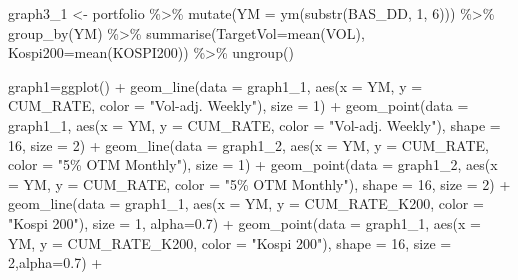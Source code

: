 \documentclass[
  a4paper,
  DIV=11,
  numbers=noendperiod]{scrreprt}
\newenvironment{Shaded}{\begin{snugshade}}{\end{snugshade}}
\newcommand{\AttributeTok}[1]{\textcolor[rgb]{0.40,0.45,0.13}{#1}}
\newcommand{\DecValTok}[1]{\textcolor[rgb]{0.68,0.00,0.00}{#1}}
\newcommand{\FloatTok}[1]{\textcolor[rgb]{0.68,0.00,0.00}{#1}}
\newcommand{\FunctionTok}[1]{\textcolor[rgb]{0.28,0.35,0.67}{#1}}
\newcommand{\NormalTok}[1]{\textcolor[rgb]{0.00,0.23,0.31}{#1}}
\newcommand{\OtherTok}[1]{\textcolor[rgb]{0.00,0.23,0.31}{#1}}
\newcommand{\SpecialCharTok}[1]{\textcolor[rgb]{0.37,0.37,0.37}{#1}}
\newcommand{\StringTok}[1]{\textcolor[rgb]{0.13,0.47,0.30}{#1}}
\begin{document}
\begin{Shaded}
\begin{Highlighting}[]
\NormalTok{graph3\_1 }\OtherTok{\textless{}{-}}\NormalTok{ portfolio }\SpecialCharTok{\%\textgreater{}\%}
  \FunctionTok{mutate}\NormalTok{(}\AttributeTok{YM =} \FunctionTok{ym}\NormalTok{(}\FunctionTok{substr}\NormalTok{(BAS\_DD, }\DecValTok{1}\NormalTok{, }\DecValTok{6}\NormalTok{))) }\SpecialCharTok{\%\textgreater{}\%}
  \FunctionTok{group\_by}\NormalTok{(YM) }\SpecialCharTok{\%\textgreater{}\%}
  \FunctionTok{summarise}\NormalTok{(}\AttributeTok{TargetVol=}\FunctionTok{mean}\NormalTok{(VOL),}
            \AttributeTok{Kospi200=}\FunctionTok{mean}\NormalTok{(KOSPI200)) }\SpecialCharTok{\%\textgreater{}\%} \FunctionTok{ungroup}\NormalTok{()}

\NormalTok{graph1}\OtherTok{=}\FunctionTok{ggplot}\NormalTok{() }\SpecialCharTok{+}
  \FunctionTok{geom\_line}\NormalTok{(}\AttributeTok{data =}\NormalTok{ graph1\_1, }\FunctionTok{aes}\NormalTok{(}\AttributeTok{x =}\NormalTok{ YM, }\AttributeTok{y =}\NormalTok{ CUM\_RATE, }\AttributeTok{color =} \StringTok{"Vol{-}adj. Weekly"}\NormalTok{), }\AttributeTok{size =} \DecValTok{1}\NormalTok{) }\SpecialCharTok{+}
  \FunctionTok{geom\_point}\NormalTok{(}\AttributeTok{data =}\NormalTok{ graph1\_1, }\FunctionTok{aes}\NormalTok{(}\AttributeTok{x =}\NormalTok{ YM, }\AttributeTok{y =}\NormalTok{ CUM\_RATE, }\AttributeTok{color =} \StringTok{"Vol{-}adj. Weekly"}\NormalTok{), }\AttributeTok{shape =} \DecValTok{16}\NormalTok{, }\AttributeTok{size =} \DecValTok{2}\NormalTok{) }\SpecialCharTok{+}
  \FunctionTok{geom\_line}\NormalTok{(}\AttributeTok{data =}\NormalTok{ graph1\_2, }\FunctionTok{aes}\NormalTok{(}\AttributeTok{x =}\NormalTok{ YM, }\AttributeTok{y =}\NormalTok{ CUM\_RATE, }\AttributeTok{color =} \StringTok{"5\% OTM Monthly"}\NormalTok{), }\AttributeTok{size =} \DecValTok{1}\NormalTok{) }\SpecialCharTok{+}
  \FunctionTok{geom\_point}\NormalTok{(}\AttributeTok{data =}\NormalTok{ graph1\_2, }\FunctionTok{aes}\NormalTok{(}\AttributeTok{x =}\NormalTok{ YM, }\AttributeTok{y =}\NormalTok{ CUM\_RATE, }\AttributeTok{color =} \StringTok{"5\% OTM Monthly"}\NormalTok{), }\AttributeTok{shape =} \DecValTok{16}\NormalTok{, }\AttributeTok{size =} \DecValTok{2}\NormalTok{) }\SpecialCharTok{+}
  \FunctionTok{geom\_line}\NormalTok{(}\AttributeTok{data =}\NormalTok{ graph1\_1, }\FunctionTok{aes}\NormalTok{(}\AttributeTok{x =}\NormalTok{ YM, }\AttributeTok{y =}\NormalTok{ CUM\_RATE\_K200, }\AttributeTok{color =} \StringTok{"Kospi 200"}\NormalTok{), }\AttributeTok{size =} \DecValTok{1}\NormalTok{, }\AttributeTok{alpha=}\FloatTok{0.7}\NormalTok{) }\SpecialCharTok{+}
  \FunctionTok{geom\_point}\NormalTok{(}\AttributeTok{data =}\NormalTok{ graph1\_1, }\FunctionTok{aes}\NormalTok{(}\AttributeTok{x =}\NormalTok{ YM, }\AttributeTok{y =}\NormalTok{ CUM\_RATE\_K200, }\AttributeTok{color =} \StringTok{"Kospi 200"}\NormalTok{), }\AttributeTok{shape =} \DecValTok{16}\NormalTok{, }\AttributeTok{size =} \DecValTok{2}\NormalTok{,}\AttributeTok{alpha=}\FloatTok{0.7}\NormalTok{) }\SpecialCharTok{+}

\end{Highlighting}
\end{Shaded}
\end{document}
